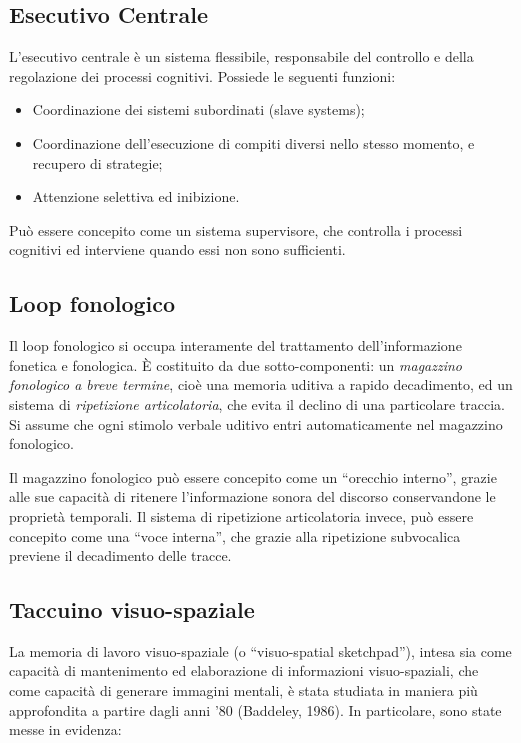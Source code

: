 \subsection{Esecutivo Centrale}
L'esecutivo centrale è un sistema flessibile, responsabile del controllo e della regolazione dei processi cognitivi. Possiede le seguenti funzioni:

\begin{itemize}
  \item Coordinazione dei sistemi subordinati (slave systems);
  \item Coordinazione dell'esecuzione di compiti diversi nello stesso momento, e recupero di strategie;
  \item Attenzione selettiva ed inibizione.
\end{itemize}

Può essere concepito come un sistema supervisore, che controlla i processi cognitivi ed interviene quando essi non sono sufficienti.

\subsection{Loop fonologico}
Il loop fonologico si occupa interamente del trattamento dell'informazione fonetica e fonologica. È costituito da due sotto-componenti: un \emph{magazzino fonologico a breve termine}, cioè una memoria uditiva a rapido decadimento, ed un sistema di \emph{ripetizione articolatoria}, che evita il declino di una particolare traccia. Si assume che ogni stimolo verbale uditivo entri automaticamente nel magazzino fonologico.

Il magazzino fonologico può essere concepito come un ``orecchio interno'', grazie alle sue capacità di ritenere l'informazione sonora del discorso conservandone le proprietà temporali. Il sistema di ripetizione articolatoria invece, può essere concepito come una ``voce interna'', che grazie alla ripetizione subvocalica previene il decadimento delle tracce.

\subsection{Taccuino visuo-spaziale}
La memoria di lavoro visuo-spaziale (o ``visuo-spatial sketchpad''), intesa sia come capacità di mantenimento ed elaborazione di informazioni visuo-spaziali, che come capacità di generare immagini mentali, è stata studiata in maniera più approfondita a partire dagli anni '80 (Baddeley, 1986). In particolare, sono state messe in evidenza:

